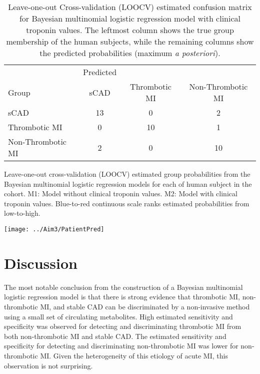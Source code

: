 \begin{DoubleSpace*}
  \begin{table}[H]
  	\centering
  	\caption[Leave-one-out Cross-validation (LOOCV) estimated confusion matrix for Bayesian multinomial logistic regression model with clinical troponin values]{\DoubleSpacing Leave-one-out Cross-validation (LOOCV) estimated confusion matrix for Bayesian multinomial logistic regression model with clinical troponin values. The leftmost column shows the true group membership of the human subjects, while the remaining columns show the predicted probabilities (maximum \emph{a posteriori}).}
  	\label{tab:modelRes2}
\begin{tabular}{l|ccc}
& Predicted & & \\
Group  &     sCAD & Thrombotic MI & Non-Thrombotic MI \\
\hline
sCAD   &     13    &     0    &     2\\
Thrombotic MI  &  0    &    10    &     1\\
Non-Thrombotic MI &   2  &   0 &    10
\end{tabular}
  \end{table}
  
\begin{table}[H]
  	\centering
 	  	\caption[Leave-one-out cross-validation (LOOCV) estimated group probabilities from the Bayesian multinomial logistic regression models for each of human subject in the cohort.]{\DoubleSpacing  Leave-one-out cross-validation (LOOCV) estimated group probabilities from the Bayesian multinomial logistic regression models for each of human subject in the cohort. M1: Model without clinical troponin values. M2: Model with clinical troponin values. Blue-to-red continuous scale ranks estimated probabilities from low-to-high.}
	  	\label{tab:modelRes3}
 	\texttt{[image: ../Aim3/PatientPred]}
\end{table}

\section{Discussion}
The most notable conclusion from the construction of a Bayesian multinomial logistic regression model is that there is strong evidence that thrombotic MI, non-thrombotic MI, and stable CAD can be discriminated by a non-invasive method using a small set of circulating metabolites. High estimated sensitivity and specificity was observed for detecting and discriminating thrombotic MI from both non-thrombotic MI and stable CAD. The estimated sensitivity and specificity for detecting and discriminating non-thrombotic MI was lower for non-thrombotic MI. Given the heterogeneity of this etiology of acute MI, this observation is not surprising. 


\end{DoubleSpace*}
